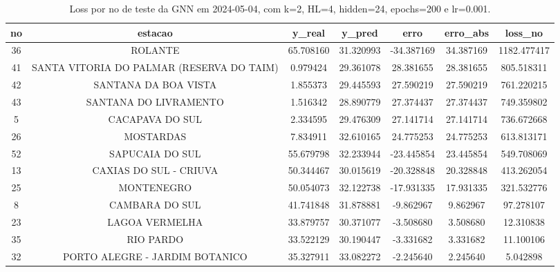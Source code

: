 \begin{table}[h]
\centering
\caption{Loss por no de teste da GNN em 2024-05-04, com k=2, HL=4, hidden=24, epochs=200 e lr=0.001.}
\label{tab:gnn_loss_k2_hl4_h24_e200_d20240504}
\begin{tabular}{ccccccc}
\toprule
no & estacao & y\_real & y\_pred & erro & erro\_abs & loss\_no \\
\midrule
36 & ROLANTE & 65.708160 & 31.320993 & -34.387169 & 34.387169 & 1182.477417 \\
41 & SANTA VITORIA DO PALMAR (RESERVA DO TAIM) & 0.979424 & 29.361078 & 28.381655 & 28.381655 & 805.518311 \\
42 & SANTANA DA BOA VISTA & 1.855373 & 29.445593 & 27.590219 & 27.590219 & 761.220215 \\
43 & SANTANA DO LIVRAMENTO & 1.516342 & 28.890779 & 27.374437 & 27.374437 & 749.359802 \\
5 & CACAPAVA DO SUL & 2.334595 & 29.476309 & 27.141714 & 27.141714 & 736.672668 \\
26 & MOSTARDAS & 7.834911 & 32.610165 & 24.775253 & 24.775253 & 613.813171 \\
52 & SAPUCAIA DO SUL & 55.679798 & 32.233944 & -23.445854 & 23.445854 & 549.708069 \\
13 & CAXIAS DO SUL - CRIUVA & 50.344467 & 30.015619 & -20.328848 & 20.328848 & 413.262054 \\
25 & MONTENEGRO & 50.054073 & 32.122738 & -17.931335 & 17.931335 & 321.532776 \\
8 & CAMBARA DO SUL & 41.741848 & 31.878881 & -9.862967 & 9.862967 & 97.278107 \\
23 & LAGOA VERMELHA & 33.879757 & 30.371077 & -3.508680 & 3.508680 & 12.310838 \\
35 & RIO PARDO & 33.522129 & 30.190447 & -3.331682 & 3.331682 & 11.100106 \\
32 & PORTO ALEGRE - JARDIM BOTANICO & 35.327911 & 33.082272 & -2.245640 & 2.245640 & 5.042898 \\
\bottomrule
\end{tabular}
\end{table}
